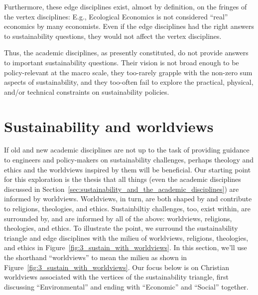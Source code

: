 \documentclass[12pt]{article}
\begin{document}
Furthermore, these edge disciplines exist, almost by definition, 
on the fringes of the vertex disciplines:
E.g., Ecological Economics is not considered ``real'' economics by many economists.
Even if the edge disciplines had the right answers to sustainability questions, 
they would not affect the vertex disciplines. 

Thus, the academic disciplines, as presently constituted,
do not provide answers to important sustainability questions.
Their vision is not broad enough to be policy-relevant at the macro scale, 
they too-rarely grapple with the non-zero sum aspects of sustainability, and
they too-often fail to explore the practical, physical, and/or technical
constraints on sustainability policies. 


\section{Sustainability and worldviews}
\label{sec:worldviews}

If old and new academic disciplines are not up to the task 
of providing guidance to engineers and policy-makers
on sustainability challenges, 
perhaps theology and ethics and the worldviews inspired by them
will be beneficial.
Our starting point for this exploration is the thesis that 
all things (even the academic disciplines discussed 
in Section~\ref{sec:sustainability_and_the_academic_disciplines})
are informed by worldviews.
Worldviews, in turn, are both shaped by and contribute to religions, theologies, and ethics.
Sustainbiltiy challenges, too, exist within, are surrounded by, and are informed by 
all of the above:
worldviews, religions, theologies, and ethics.
To illustrate the point, we surround the sustainability triangle and edge disciplines with the 
milieu of worldviews, religions, theologies, and ethics in Figure~\ref{fig:3_sustain_with_worldviews}.
In this section, we'll use the shorthand ``worldviews'' to mean the milieu 
as shown in Figure~\ref{fig:3_sustain_with_worldviews}.
Our focus below is on Christian worldviews 
associated with the vertices of the sustainability triangle, 
first discussing ``Environmental'' and ending with 
``Economic'' and ``Social'' together.
\end{document}
